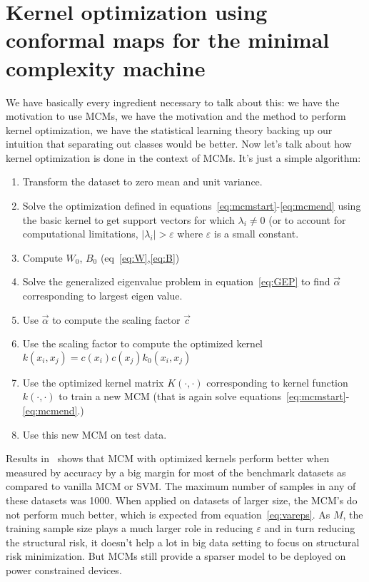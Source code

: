 \documentclass[11pt]{article}
\begin{document}
\section{Kernel optimization using conformal maps for the minimal complexity
machine~\cite{keropt}}
We have basically every ingredient necessary to talk about this: we have the
motivation to use MCMs, we have the motivation and the method to perform
kernel optimization, we have the statistical learning theory backing up our
intuition that separating out classes would be better. Now let's talk about how
kernel optimization is done in the context of MCMs. It's just a simple
algorithm:
\begin{enumerate}
    \item Transform the dataset to zero mean and unit variance.
    \item Solve the optimization defined in
        equations~\ref{eq:mcmstart}-\ref{eq:mcmend} using the basic kernel to
        get support vectors for which $\lambda_i \ne 0$ (or to account for
        computational limitations, $\lvert\lambda_i\rvert > \varepsilon$ where
        $\varepsilon$ is a small constant.
    \item Compute $W_0$, $B_0$ (eq~\ref{eq:W},\ref{eq:B})
    \item Solve the generalized eigenvalue problem in equation~\ref{eq:GEP} to
        find $\vec{\alpha}$ corresponding to largest eigen value.
    \item Use $\vec{\alpha}$ to compute the scaling factor $\vec{c}$
    \item Use the scaling factor to compute the optimized kernel
        $k(x_i,x_j)=c(x_i)c(x_j)k_0(x_i,x_j)$
    \item Use the optimized kernel matrix $K(\cdot,\cdot)$ corresponding to
        kernel function $k(\cdot,\cdot)$ to train a new MCM (that is again solve
        equations~\ref{eq:mcmstart}-\ref{eq:mcmend}.)
    \item Use this new MCM on test data.
\end{enumerate}
\par
Results in~\cite{keropt} shows that MCM with optimized kernels perform better when
measured by accuracy by a big margin for most of the benchmark datasets as
compared to vanilla MCM or SVM.  The maximum number of samples in any of these
datasets was 1000. When applied on datasets of larger size, the MCM's do not
perform much better, which is expected from equation~\ref{eq:vareps}. As $M$,
the training sample size plays a much larger role in reducing $\varepsilon$ and
in turn reducing the structural risk, it doesn't help a lot in big data setting
to focus on structural risk minimization. But MCMs still provide a sparser model
to be deployed on power constrained devices.
\clearpage
\end{document}
